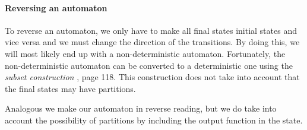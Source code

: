 \documentclass{article}
\theoremstyle{definition}
\begin{document}
\paragraph{Reversing an automaton}
To reverse an automaton, we only have to make all final states initial states
and vice versa and we must change the direction of the transitions. By doing 
this, we will most likely end up with a non-deterministic automaton. 
Fortunately, the non-deterministic automaton can be converted to a 
deterministic one using the \emph{subset construction} \cite{Wood}, page 118. 
This construction does not take into account that the final states may have 
partitions.

Analogous we make our automaton in reverse reading, but we do take into account
the possibility of partitions by including the output function in the state.
\end{document}
